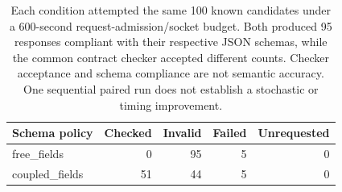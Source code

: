 \begin{table}[t]
\centering
\small
\begin{tabular}{lrrrr}
\toprule
Schema policy & Checked & Invalid & Failed & Unrequested \\
\midrule
free\_fields & 0 & 95 & 5 & 0 \\
coupled\_fields & 51 & 44 & 5 & 0 \\
\bottomrule
\end{tabular}
\caption{Each condition attempted the same 100 known candidates under a 600-second request-admission/socket budget. Both produced 95 responses compliant with their respective JSON schemas, while the common contract checker accepted different counts. Checker acceptance and schema compliance are not semantic accuracy. One sequential paired run does not establish a stochastic or timing improvement.}
\label{tab:live-contract-oct23}
\end{table}
